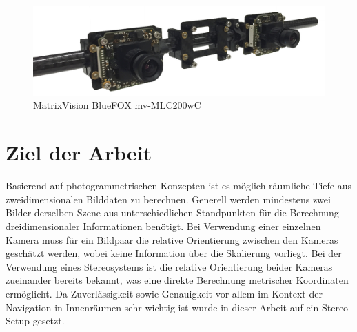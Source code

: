 \begin{figure}[h]
	\centering
	\includegraphics[width=13cm]{img/cameras}
	\caption{MatrixVision BlueFOX mv-MLC200wC \cite{matrixvision}}
	\label{fig:cameras}
\end{figure}

\pagebreak
\section{Ziel der Arbeit}
\label{sec:ziel_der_arbeit}
Basierend auf photogrammetrischen Konzepten ist es möglich räumliche Tiefe aus zweidimensionalen Bilddaten zu berechnen. Generell werden mindestens zwei Bilder derselben Szene aus unterschiedlichen Standpunkten für die Berechnung dreidimensionaler Informationen benötigt. Bei Verwendung einer einzelnen Kamera muss für ein Bildpaar die relative Orientierung zwischen den Kameras geschätzt werden, wobei keine Information über die Skalierung vorliegt. Bei der Verwendung eines Stereosystems ist die relative Orientierung beider Kameras zueinander bereits bekannt, was eine direkte Berechnung metrischer Koordinaten ermöglicht. Da Zuverlässigkeit sowie Genauigkeit vor allem im Kontext der Navigation in Innenräumen sehr wichtig ist wurde in dieser Arbeit auf ein Stereo-Setup gesetzt.\\

